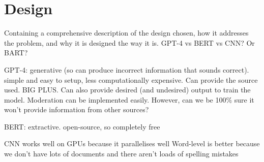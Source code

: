 \chapter{Design}


Containing a comprehensive description of the design chosen, how it addresses the problem, and why it is designed the way it is. GPT-4 vs BERT vs CNN? Or BART?


GPT-4: generative (so can produce incorrect information that sounds correct). simple and easy to setup, less computationally expensive. Can provide the source used. BIG PLUS. Can also provide desired (and undesired) output to train the model. Moderation can be implemented easily. However, can we be 100\% sure it won't provide information from other sources? 

BERT: extractive. open-source, so completely free


CNN works well on GPUs because it parallelises well
Word-level is better because we don't have lots of documents and there aren't loads of spelling mistakes





